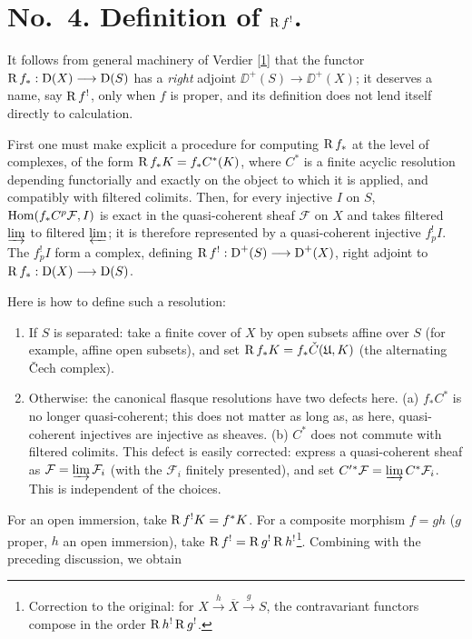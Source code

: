 \section*{No.\ 4. Definition of $\operatorname{R} f^!$.}\label{appen:sec4}

It follows from general machinery of Verdier \hyperref[appen:bib1]{[1]} that the functor $\operatorname{R} f_*:\operatorname{D}(X)\longrightarrow\operatorname{D}(S)$ has a \emph{right} adjoint $\DD^+(S)\longrightarrow\DD^+(X)$; it deserves a name, say $\operatorname{R} f^!$, only when $f$ is proper, and its definition does not lend itself directly to calculation.

First one must make explicit a procedure for computing $\operatorname{R} f_*$ at the level of complexes, of the form $\operatorname{R} f_*K=f_*C^*(K)$, where $C^*$ is a finite acyclic resolution depending functorially and exactly on the object to which it is applied, and compatibly with filtered colimits. Then, for every injective $I$ on $S$, $\operatorname{Hom}(f_*C^p\mathcal F,I)$ is exact in the quasi-coherent sheaf $\mathcal F$ on $X$ and takes filtered $\varinjlim$ to filtered $\varprojlim$; it is therefore represented by a quasi-coherent injective $f_p^!I$. The $f_p^!I$ form a complex, defining $\operatorname{R} f^!:\operatorname{D}^+(S)\longrightarrow\operatorname{D}^+(X)$, right adjoint to $\operatorname{R} f_*:\operatorname{D}(X)\longrightarrow\operatorname{D}(S)$.

Here is how to define such a resolution:
\begin{enumerate}
\item[1)] If $S$ is separated: take a finite cover of $X$ by open subsets affine over $S$ (for example, affine open subsets), and set $\operatorname{R} f_*K=f_*\check C(\mathfrak U,K)$ (the alternating \v{C}ech complex).

\item[2)] Otherwise: the canonical flasque resolutions have two defects here. (a) $f_*C^*$ is no longer quasi-coherent; this does not matter as long as, as here, quasi-coherent injectives are injective as sheaves. (b) $C^*$ does not commute with filtered colimits. This defect is easily corrected: express a quasi-coherent sheaf as $\mathcal F=\varinjlim\mathcal F_i$ (with the $\mathcal F_i$ finitely presented), and set $C'{}^*\mathcal F=\varinjlim C^*\mathcal F_i$. This is independent of the choices.
\end{enumerate}

For an open immersion, take $\operatorname{R} f^!K=f^*K$. For a composite morphism $f=gh$ ($g$ proper, $h$ an open immersion), take $\operatorname{R} f^!=\operatorname{R} g^!\operatorname{R} h^!$\footnote{Correction to the original: for $X\xrightarrow{h}\overline X\xrightarrow{g}S$, the contravariant functors compose in the order $\operatorname{R} h^!\operatorname{R} g^!$.}. Combining  with the preceding discussion, we obtain

